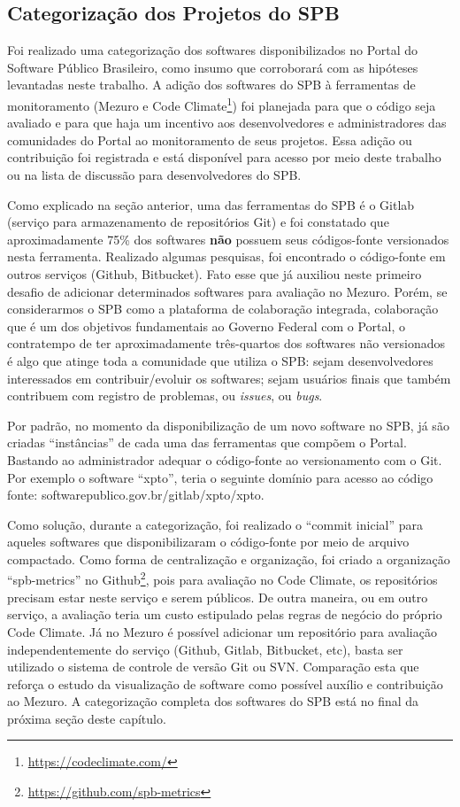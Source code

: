 \subsection{Categorização dos Projetos do SPB}

Foi realizado uma categorização dos softwares disponibilizados no Portal do
Software Público Brasileiro, como insumo que corroborará com as hipóteses
levantadas neste trabalho. A adição dos softwares do SPB à ferramentas de
monitoramento (Mezuro e Code Climate\footnote{\url{https://codeclimate.com/}})
foi planejada para que o código seja avaliado e para que haja um incentivo aos
desenvolvedores e administradores das comunidades do Portal ao monitoramento de
seus projetos. Essa adição ou contribuição foi registrada e está disponível
para acesso por meio deste trabalho ou na lista de discussão para
desenvolvedores do SPB.

Como explicado na seção anterior, uma das ferramentas do SPB é o Gitlab
(serviço para armazenamento de repositórios Git) e foi constatado que
aproximadamente 75\% dos softwares \textbf{não} possuem seus códigos-fonte
versionados nesta ferramenta. Realizado algumas pesquisas, foi encontrado o
código-fonte em outros serviços (Github, Bitbucket). Fato esse que já auxiliou
neste primeiro desafio de adicionar determinados softwares para avaliação no
Mezuro. Porém, se considerarmos o SPB como a plataforma de colaboração
integrada, colaboração que é um dos objetivos fundamentais ao Governo Federal
com o Portal, o contratempo de ter aproximadamente três-quartos dos softwares
não versionados é algo que atinge toda a comunidade que utiliza o SPB: sejam
desenvolvedores interessados em contribuir/evoluir os softwares; sejam usuários
finais que também contribuem com registro de problemas, ou \textit{issues}, ou
\textit{bugs}.

Por padrão, no momento da disponibilização de um novo software no SPB, já são
criadas ``instâncias'' de cada uma das ferramentas que compõem o Portal. Bastando
ao administrador adequar o código-fonte ao versionamento com o Git. Por exemplo
o software ``xpto'', teria o seguinte domínio para acesso ao código fonte:
softwarepublico.gov.br/gitlab/xpto/xpto.

Como solução, durante a categorização, foi realizado o ``commit inicial'' para
aqueles softwares que disponibilizaram o código-fonte por meio de arquivo
compactado. Como forma de centralização e organização, foi criado a organização
``spb-metrics'' no Github\footnote{\url{https://github.com/spb-metrics}}, pois
para avaliação no Code Climate, os repositórios precisam estar neste serviço e
serem públicos. De outra maneira, ou em outro serviço, a avaliação teria um
custo estipulado pelas regras de negócio do próprio Code Climate. Já no Mezuro é
possível adicionar um repositório para avaliação independentemente do serviço
(Github, Gitlab, Bitbucket, etc), basta ser utilizado o sistema de controle de
versão Git ou SVN. Comparação esta que reforça o estudo da visualização de
software como possível auxílio e contribuição ao Mezuro. A categorização
completa dos softwares do SPB está no final da próxima seção deste capítulo.

